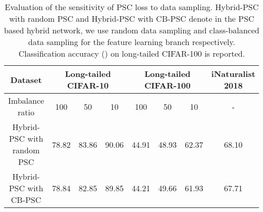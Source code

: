 \documentclass[final]{cvpr}
\begin{document}
\begin{table*}[t]
\footnotesize
\center
\caption{Evaluation of the sensitivity of PSC loss to data sampling. Hybrid-PSC with random PSC and Hybrid-PSC with CB-PSC denote in the PSC based hybrid network, we use random data sampling and class-balanced data sampling for the feature learning branch respectively. Classification accuracy () on long-tailed CIFAR-100 is reported.}
\vspace{0.5em}
\label{tab:sensitivity}
\begin{tabular}{|c||l|l|l|c|l|l|c|}
\hline
Dataset                               & \multicolumn{3}{c|}{Long-tailed CIFAR-10}                                    & \multicolumn{3}{c|}{Long-tailed CIFAR-100}                                & iNaturalist 2018 \\ \hline 
Imbalance ratio                       & \multicolumn{1}{c|}{100} & \multicolumn{1}{c|}{50} & \multicolumn{1}{c|}{10} & 100                   & \multicolumn{1}{c|}{50} & \multicolumn{1}{c|}{10} & -                \\ \hline \hline
Hybrid-PSC with random PSC            & 78.82                    & 83.86                   & 90.06                   & 44.91                 & 48.93                   & 62.37                   & 68.10            \\ \hline
Hybrid-PSC with CB-PSC                & 78.84                    & 82.85                   & 89.85                   & 44.21                 & 49.66                   & 61.93                   & 67.71            \\ \hline
\end{tabular}
\end{table*}
\end{document}
